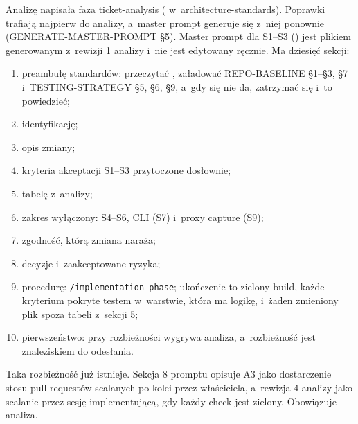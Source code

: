 Analizę napisała faza ticket-analysis (
w~architecture-standards). Poprawki trafiają najpierw do analizy, a~master prompt generuje
się z~niej ponownie (GENERATE-MASTER-PROMPT §5). Master prompt dla S1–S3
() jest plikiem generowanym z~rewizji 1 analizy
i~nie jest edytowany ręcznie. Ma dziesięć sekcji:
\begin{enumerate}
  \item preambułę standardów: przeczytać , załadować
        REPO-BASELINE §1–§3, §7 i~TESTING-STRATEGY §5, §6, §9, a~gdy się nie da, zatrzymać
        się i~to powiedzieć;
  \item identyfikację;
  \item opis zmiany;
  \item kryteria akceptacji S1–S3 przytoczone dosłownie;
  \item tabelę z~analizy;
  \item zakres wyłączony: S4–S6, CLI (S7) i~proxy capture (S9);
  \item zgodność, którą zmiana naraża;
  \item decyzje i~zaakceptowane ryzyka;
  \item procedurę: \texttt{/implementation-phase}; ukończenie to zielony build, każde
        kryterium pokryte testem w~warstwie, która ma logikę, i~żaden zmieniony plik spoza
        tabeli z~sekcji 5;
  \item pierwszeństwo: przy rozbieżności wygrywa analiza, a~rozbieżność jest znaleziskiem
        do odesłania.
\end{enumerate}
Taka rozbieżność już istnieje. Sekcja 8 promptu opisuje A3 jako dostarczenie stosu pull
requestów scalanych po kolei przez właściciela, a~rewizja 4 analizy jako scalanie przez
sesję implementującą, gdy każdy check jest zielony. Obowiązuje analiza.

